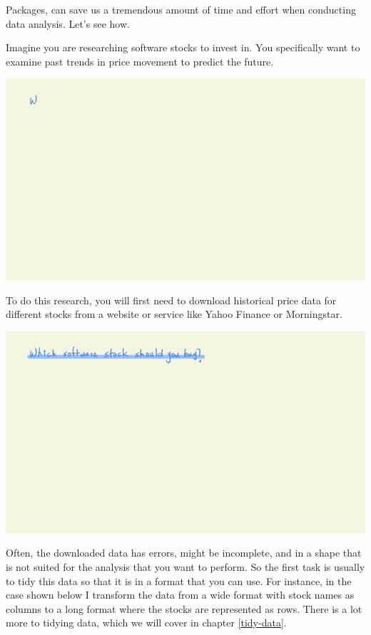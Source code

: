 \documentclass[
]{book}
\begin{document}
Packages, can save us a tremendous amount of time and effort when conducting data analysis. Let's see how.

Imagine you are researching software stocks to invest in. You specifically want to examine past trends in price movement to predict the future.

\includegraphics{assets/packages/gifs/stock_qstn.gif}

To do this research, you will first need to download historical price data for different stocks from a website or service like Yahoo Finance or Morningstar.

\includegraphics{assets/packages/gifs/extract.gif}

Often, the downloaded data has errors, might be incomplete, and in a shape that is not suited for the analysis that you want to perform. So the first task is usually to tidy this data so that it is in a format that you can use. For instance, in the case shown below I transform the data from a wide format with stock names as columns to a long format where the stocks are represented as rows. There is a lot more to tidying data, which we will cover in chapter \ref{tidy-data}.
\end{document}
